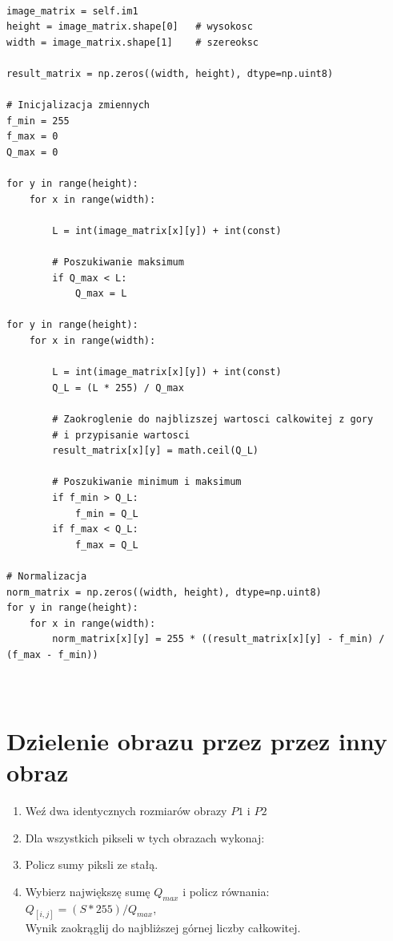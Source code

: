 \documentclass[final,a4paper,openany,12pt]{mwbk}
\begin{document}
\begin{lstlisting}[caption=Dzielenie obrazu szarego przez (zadaną) liczbę ]

image_matrix = self.im1
height = image_matrix.shape[0]   # wysokosc
width = image_matrix.shape[1]    # szereoksc

result_matrix = np.zeros((width, height), dtype=np.uint8)

# Inicjalizacja zmiennych
f_min = 255
f_max = 0
Q_max = 0

for y in range(height):
    for x in range(width):  

        L = int(image_matrix[x][y]) + int(const)

        # Poszukiwanie maksimum
        if Q_max < L:
            Q_max = L

for y in range(height):
    for x in range(width):  

        L = int(image_matrix[x][y]) + int(const)
        Q_L = (L * 255) / Q_max

        # Zaokroglenie do najblizszej wartosci calkowitej z gory
        # i przypisanie wartosci
        result_matrix[x][y] = math.ceil(Q_L)

        # Poszukiwanie minimum i maksimum
        if f_min > Q_L:
            f_min = Q_L
        if f_max < Q_L:
            f_max = Q_L

# Normalizacja
norm_matrix = np.zeros((width, height), dtype=np.uint8)
for y in range(height):
    for x in range(width):
        norm_matrix[x][y] = 255 * ((result_matrix[x][y] - f_min) / (f_max - f_min))
        
        
\end{lstlisting}

\section {Dzielenie obrazu przez przez inny obraz}
\vspace{5mm}
	\begin{enumerate}	
		\item Weź dwa identycznych rozmiarów obrazy $P1$ i $P2$
		\item Dla wszystkich pikseli w tych obrazach wykonaj:
		\item Policz sumy piksli ze stałą.
		\item Wybierz największę sumę $Q_{max}$ i policz równania:\\
		$Q_[i,j] = ({S} * 255)/Q_{max}$,\\
		Wynik zaokrąglij do najbliższej górnej liczby całkowitej.
	\end{enumerate}
	
\end{document}
